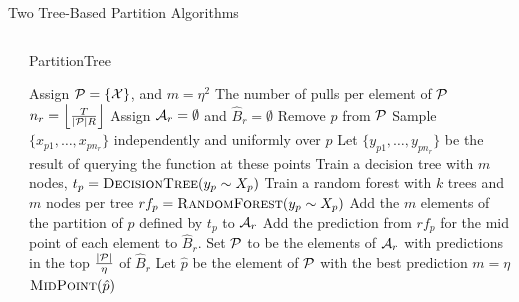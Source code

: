 \documentclass[final]{beamer}
\newlength{\onecolwid}
\newlength{\twocolwid}
\begin{document}
\begin{frame}[t]
\begin{columns}[t]
\begin{column}{\twocolwid}
\begin{block}{Two Tree-Based Partition Algorithms}
\begin{columns}[t,totalwidth=\twocolwid]
\begin{column}{\onecolwid}
\begin{algorithm}[H]
\end{algorithm}

\end{column} %


\begin{column}{\onecolwid}\vspace{-.6in} %

\begin{algorithm}[H]
\scriptsize
\caption{PartitionTree}
\label{part_tree}
\begin{algorithmic}[1]
\State Assign $\mathcal{P} = \{\mathcal{X}\}$, and $m = \eta^2$
\State The number of pulls per element of $\mathcal{P}$ $n_r = \left \lfloor \frac{T}{|\mathcal{P}| R} \right \rfloor$
\State Assign $\mathcal{A}_r = \emptyset$ and $\hat{B}_r = \emptyset$
\State Remove $p$ from $\mathcal{P}$
\State Sample $\{x_{p1},\ldots, x_{pn_r}\}$ independently and uniformly over $p$
\State Let $\{y_{p1},\ldots, y_{pn_r}\}$ be the result of querying the function at these points
\State Train a decision tree with $m$ nodes, $t_p = \textproc{DecisionTree}(y_p \sim X_p)$
\State Train a random forest with $k$ trees and $m$ nodes per tree  
\State $rf_p = \textproc{RandomForest}(y_p \sim X_p)$
\State Add the $m$ elements of the partition of $p$ defined by $t_p$ to $\mathcal{A}_r$
\State Add the prediction from $rf_p$ for the mid point of each element to $\hat{B}_r$.
\EndFor
\State Set $\mathcal{P}$ to be the elements of $\mathcal{A}_r$ with predictions in the top $\frac{|\mathcal{P}|}{\eta}$ of $\hat{B}_r$
\State Let $\hat{p}$ be the element of $\mathcal{P}$ with the best prediction
\State $m = \eta$
\EndFor
\State \Return $\textproc{MidPoint}(\hat{p})$
\EndProcedure
\end{algorithmic}
\end{algorithm}

\end{column} %

\end{columns} %
\end{block}



\end{column}
\end{columns}
\end{frame}
\end{document}
